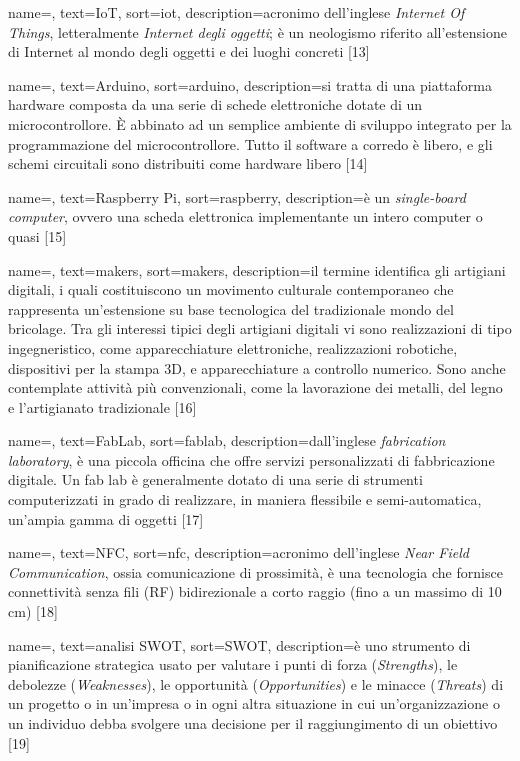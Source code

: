 {
	name=,
    text=IoT,
    sort=iot,
    description={acronimo dell'inglese \textit{Internet Of Things}, letteralmente \textit{Internet degli oggetti}; è un neologismo riferito all'estensione di Internet al mondo degli oggetti e dei luoghi concreti [13]}
}

{
	name=,
    text=Arduino,
    sort=arduino,
    description={si tratta di una piattaforma hardware composta da una serie di schede elettroniche dotate di un microcontrollore. È abbinato ad un semplice ambiente di sviluppo integrato per la programmazione del microcontrollore. Tutto il software a corredo è libero, e gli schemi circuitali sono distribuiti come hardware libero [14]}
}

{
	name=,
    text=Raspberry Pi,
    sort=raspberry,
    description={è un \textit{single-board computer}, ovvero una scheda elettronica implementante un intero computer o quasi [15]}
}

{
	name=,
    text=makers,
    sort=makers,
    description={il termine identifica gli artigiani digitali, i quali costituiscono un movimento culturale contemporaneo che rappresenta un'estensione su base tecnologica del tradizionale mondo del bricolage. Tra gli interessi tipici degli artigiani digitali vi sono realizzazioni di tipo ingegneristico, come apparecchiature elettroniche, realizzazioni robotiche, dispositivi per la stampa 3D, e apparecchiature a controllo numerico. Sono anche contemplate attività più convenzionali, come la lavorazione dei metalli, del legno e l'artigianato tradizionale [16]}
}

{
	name=,
    text=FabLab,
    sort=fablab,
    description={dall'inglese \textit{fabrication laboratory}, è una piccola officina che offre servizi personalizzati di fabbricazione digitale. Un fab lab è generalmente dotato di una serie di strumenti computerizzati in grado di realizzare, in maniera flessibile e semi-automatica, un'ampia gamma di oggetti [17]}
}

{
	name=,
    text=NFC,
    sort=nfc,
    description={acronimo dell'inglese \textit{Near Field Communication}, ossia comunicazione di prossimità, è una tecnologia che fornisce connettività senza fili (RF) bidirezionale a corto raggio (fino a un massimo di 10 cm) [18]}
}

{
	name=,
    text=analisi SWOT,
    sort=SWOT,
    description={è uno strumento di pianificazione strategica usato per valutare i punti di forza (\textit{Strengths}), le debolezze (\textit{Weaknesses}), le opportunità (\textit{Opportunities}) e le minacce (\textit{Threats}) di un progetto o in un'impresa o in ogni altra situazione in cui un'organizzazione o un individuo debba svolgere una decisione per il raggiungimento di un obiettivo [19]}
}


